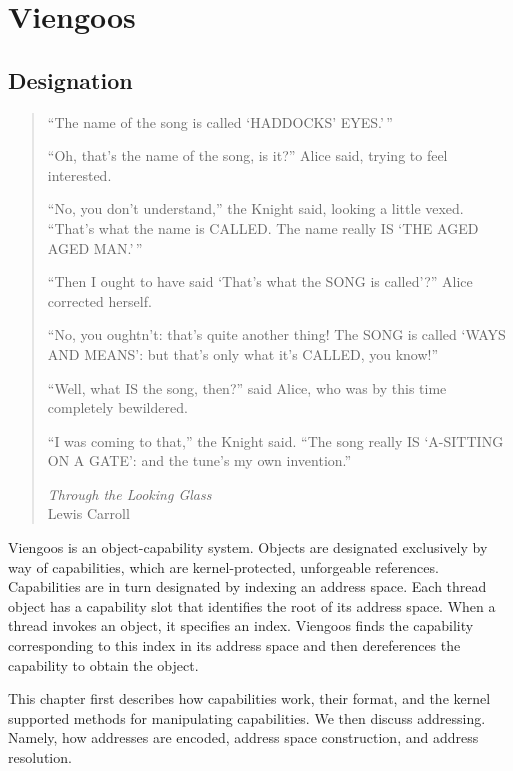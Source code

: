 \part{Viengoos}

\chapter{Designation}

\begin{quotation}
  ``The name of the song is called `HADDOCKS' EYES.'\,''

  ``Oh, that's the name of the song, is it?'' Alice said, trying to feel
  interested.

  ``No, you don't understand,'' the Knight said, looking a little vexed.
  ``That's what the name is CALLED.  The name really IS `THE AGED AGED
  MAN.'\,''

  ``Then I ought to have said `That's what the SONG is called'?''
  Alice corrected herself.

  ``No, you oughtn't: that's quite another thing!  The SONG is called
  `WAYS AND MEANS': but that's only what it's CALLED, you know!''

  ``Well, what IS the song, then?'' said Alice, who was by this
  time completely bewildered.

  ``I was coming to that,'' the Knight said.  ``The song really IS
  `A-SITTING ON A GATE':  and the tune's my own invention.''

  \begin{flushright}
    \emph{Through the Looking Glass}\\
    Lewis Carroll
  \end{flushright}
\end{quotation}


Viengoos is an object-capability system.  Objects are designated
exclusively by way of capabilities, which are kernel-protected,
unforgeable references.  Capabilities are in turn designated by
indexing an address space.  Each thread object has a capability slot
that identifies the root of its address space.  When a thread invokes
an object, it specifies an index.  Viengoos finds the capability
corresponding to this index in its address space and then dereferences
the capability to obtain the object.

This chapter first describes how capabilities work, their format, and
the kernel supported methods for manipulating capabilities.  We then
discuss addressing.  Namely, how addresses are encoded, address space
construction, and address resolution.


